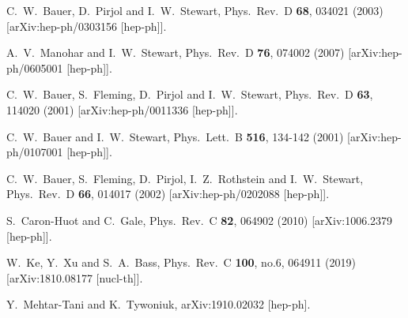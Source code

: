 \documentclass[letter,11pt]{article}
\begin{document}
\begin{thebibliography}{99}
C.~W.~Bauer, D.~Pirjol and I.~W.~Stewart,
Phys.\ Rev.\ D \textbf{68}, 034021 (2003)
[arXiv:hep-ph/0303156 [hep-ph]].


A.~V.~Manohar and I.~W.~Stewart,
Phys.\ Rev.\ D \textbf{76}, 074002 (2007)
[arXiv:hep-ph/0605001 [hep-ph]].


C.~W.~Bauer, S.~Fleming, D.~Pirjol and I.~W.~Stewart,
Phys.\ Rev.\ D \textbf{63}, 114020 (2001)
[arXiv:hep-ph/0011336 [hep-ph]].


C.~W.~Bauer and I.~W.~Stewart,
Phys.\ Lett.\ B \textbf{516}, 134-142 (2001)
[arXiv:hep-ph/0107001 [hep-ph]].
  
  
C.~W.~Bauer, S.~Fleming, D.~Pirjol, I.~Z.~Rothstein and I.~W.~Stewart,
Phys.\ Rev.\ D \textbf{66}, 014017 (2002)
[arXiv:hep-ph/0202088 [hep-ph]].


  
  S.~Caron-Huot and C.~Gale,
  Phys.\ Rev.\ C {\bf 82}, 064902 (2010)
  [arXiv:1006.2379 [hep-ph]].

W.~Ke, Y.~Xu and S.~A.~Bass,
Phys.\ Rev.\ C \textbf{100}, no.6, 064911 (2019)
[arXiv:1810.08177 [nucl-th]].

  Y.~Mehtar-Tani and K.~Tywoniuk,
  arXiv:1910.02032 [hep-ph].


\end{thebibliography}
\end{document}

